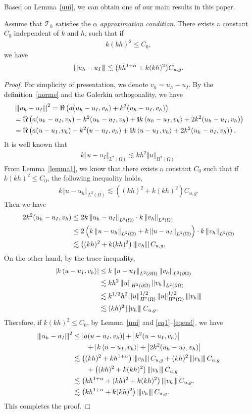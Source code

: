 \documentclass[leqno,final]{siamltex}
\numberwithin{equation}{section}
\newcommand{\norm}[1]{\left\Vert#1\right\Vert}
\newcommand{\norme}[1]{\left\Vert{\hskip -2.7pt}\left\vert #1 \right\vert{\hskip -2.7pt}\right\Vert}
\newcommand{\abs}[1]{\left\vert#1\right\vert}
\newcommand{\pd}[1]{\left\langle #1\right\rangle}
\newcommand{\nn}{\nonumber}
\newcommand{\ls}{\lesssim}
\newcommand{\al}{\alpha}
\newcommand{\Om}{\Omega}
\newcommand{\pa}{\partial}
\renewcommand{\i}{{\rm\mathbf i}}
\newcommand{\T}{\mathcal{T}}
\newcommand{\eq}[1]{\begin{align}#1\end{align}}
\newcommand{\eqn}[1]{\begin{align*}#1\end{align*}}
\begin{document}
Based on Lemma~\ref{uui}, we can obtain one of our main results in this paper.
\begin{theorem} \label{uhui}
Assume that $\T_h$ satisfies the \emph{$\al$ approximation condition}. There exists a constant $C_0$
independent of $k$ and $h$, such that if
\eq{k(kh)^2\leq C_0,}
we have
\eq{ \norme{u_h-u_I} \ls \big(kh^{1+\al}+k(kh)^2\big) C_{u,g}. \label{eq:th1eq1} }
\end{theorem}

\begin{proof}
For simplicity of presentation, we denote $v_h=u_h-u_I$. By the definition~\eqref{norme} and the Galerkin orthogonality, we have
\eq{
&\norme{u_h-u_I}^2 = \Re \left( a(u_h-u_I,v_h) + k^2(u_h-u_I,v_h) \right) \label{eq1}\\
&= \Re \left( a(u_h-u_I,v_h) - k^2(u_h-u_I,v_h) + \i k\pd{u_h-u_I,v_h} + 2k^2(u_h-u_I,v_h) \right)  \nn\\
&= \Re \left( a(u-u_I,v_h) - k^2(u-u_I,v_h) + \i k\pd{u-u_I,v_h} + 2k^2(u_h-u_I,v_h) \right).\nn
}
It is well known that
\eq{ k\norm{u-u_I}_{L^2(\Om)} \ls kh^2\norm{u}_{H^2(\Om)}.}
From Lemma~\ref{lemma1}, we know that there exists a constant $C_0$ such that if $k(kh)^2\leq C_0$,
the following inequality holds,
\eqn{ k\norm{u-u_h}_{L^2(\Om)} \ls \left((kh)^2+k(kh)^2\right) C_{u,g}. }
Then we have
\eq{2k^2(u_h-u_I,v_h)&\leq 2k\norm{u_h-u_I}_{L^2(\Om)}\cdot k\norm{v_h}_{L^2(\Om)} \\
&\leq 2\left(k\norm{u-u_h}_{L^2(\Om)}+k\norm{u-u_I}_{L^2(\Om)}\right)\cdot k\norm{v_h}_{L^2(\Om)}   \nn\\
&\ls  \left((kh)^2+k(kh)^2\right) \norme{v_h} C_{u,g}.\nn
}
On the other hand, by the trace inequality,
\eq{
\abs{k\pd{u-u_I,v_h}} &\leq k\norm{u-u_I}_{L^2(\pa\Om)}\norm{v_h}_{L^2(\pa\Om)} \label{eqend}   \\
&\ls  kh^2\norm{u}_{H^2(\pa\Om)}\norm{v_h}_{L^2(\pa\Om)}   \nn\\
&\ls k^{1/2}h^2\norm{u}^{1/2}_{H^2(\Om)}\norm{u}^{1/2}_{H^3(\Om)}\norme{v_h}    \nn\\
&\ls (kh)^2 \norme{v_h} C_{u,g}.\nn
}
Therefore, if $k(kh)^2\leq C_0$, by Lemma~\ref{uui} and \eqref{eq1}--\eqref{eqend}, we have
\eqn{
\norme{u_h-u_I}^2 &\leq \abs{a(u-u_I,v_h)} + \abs{k^2(u-u_I,v_h)}\nn\\
&\qquad + \abs{k\pd{u-u_I,v_h}} + \abs{2k^2(u_h-u_I,v_h)} \\
&\ls \left((kh)^2+kh^{1+\al}\right)\norme{v_h} C_{u,g} + (kh)^2 \norme{v_h} C_{u,g} \nn\\
&\qquad+ \left((kh)^2+k(kh)^2\right) \norme{v_h} C_{u,g} \nn\\
&\ls \left(kh^{1+\al}+(kh)^2+k(kh)^2\right)\norme{v_h} C_{u,g}. \nn\\
&\ls \left(kh^{1+\al}+k(kh)^2\right)\norme{v_h} C_{u,g}. \nn
}
This completes the proof.
\end{proof}
\end{document}
